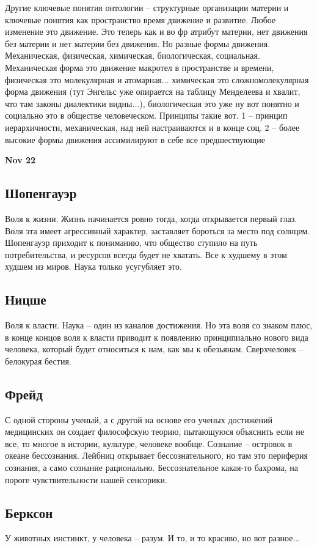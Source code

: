 \documentclass[a4paper, 12pt]{article}
\begin{document}
Другие ключевые понятия онтологии -- структурные организации материи 
и ключевые понятия как пространство время движение и развитие. Любое 
изменение это движение. Это теперь как и во фр атрибут материи, нет 
движения без материи и нет материи без движения. Но разные формы 
движения. Механическая, физическая, химическая, биологическая, 
социальная. Механическая форма это движение макротел в пространстве 
и времени, физическая это молекулярная и атомарная... химическая это 
сложномолекулярная форма движения (тут Энгельс уже опирается на таблицу 
Менделеева и хвалит, что там законы диалектики видны...), биологическая 
это уже ну вот понятно и социально это в обществе человеческом. Принципы 
такие вот. 1 -- принцип иерархичности, механическая, над ней 
настраиваются и в конце соц. 2 -- более высокие формы движения 
ассимилируют в себе все предшествующие 

\hfill \textbf{Nov 22}

\subsection{Шопенгауэр}

Воля к жизни. Жизнь начинается ровно тогда, когда открывается первый 
глаз. Воля эта имеет агрессивный характер, заставляет бороться за место 
под солнцем. Шопенгауэр приходит к пониманию, что общество ступило на 
путь потребительства, и ресурсов всегда будет не хватать. Все к худшему 
в этом худшем из миров. Наука только усугубляет это.

\subsection{Ницше}

Воля к власти. Наука -- один из каналов достижения. Но эта воля со 
знаком плюс, в конце концов воля к власти приводит к появлению 
принципиально нового вида человека, который будет относиться к нам, как 
мы к обезьянам. Сверхчеловек -- белокурая бестия.

\subsection{Фрейд}

С одной стороны ученый, а с другой на основе его ученых достижений 
медицинских он создает философскую теорию, пытающуюся объяснить если не 
все, то многое в истории, культуре, человеке вообще. Сознание -- 
островок в океане бессознания. Лейбниц открывает бессознательного, но 
там это периферия сознания, а само сознание рационально. Бессознательное 
какая-то бахрома, на пороге чувствительности нашей сенсорики.

\subsection{Берксон}

У животных инстинкт, у человека -- разум. И то, и то красиво, но вот 
разное...

\end{document}
